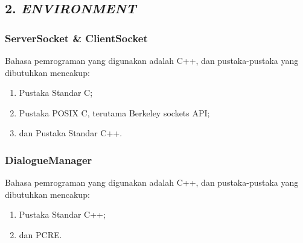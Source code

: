 \subsection*{\textcolor{subsectioncolor}{\textsf{2. \textit{ENVIRONMENT}}}}

\subsubsection*{ServerSocket \& ClientSocket}
Bahasa pemrograman yang digunakan adalah C++,
dan pustaka-pustaka yang dibutuhkan mencakup:
\begin{enumerate}
\item Pustaka Standar C;
\item Pustaka POSIX C, terutama Berkeley sockets API;
\item dan Pustaka Standar C++.
\end{enumerate}

\subsubsection*{DialogueManager}
Bahasa pemrograman yang digunakan adalah C++,
dan pustaka-pustaka yang dibutuhkan mencakup:
\begin{enumerate}
\item Pustaka Standar C++;
\item dan PCRE.
\end{enumerate}
